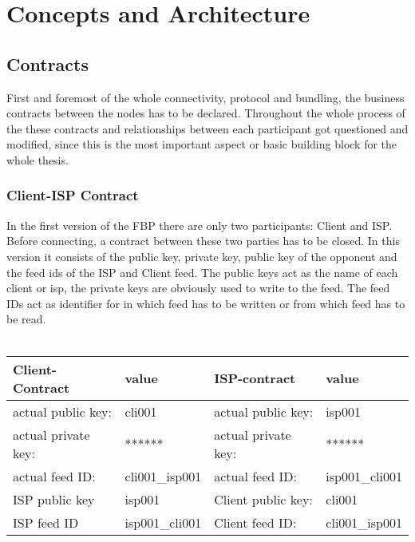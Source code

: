 \chapter{Concepts and Architecture}



\section{Contracts}
First and foremost of the whole connectivity, protocol and bundling, the business contracts between the nodes has to be declared. Throughout the whole process of the these contracts and relationships between each participant got questioned and modified, since this is the most important aspect or basic building block for the whole thesis. 

\subsection{Client-ISP Contract}
In the first version of the FBP there are only two participants: Client and ISP. Before connecting, a contract between these two parties has to be closed. In this version it consists of the public key, private key, public key of the opponent and the feed ids of the ISP and Client feed. The public keys act as the name of each client or isp, the private keys are obviously used to write to the feed. The feed IDs act as identifier for in which feed has to be written or from which feed has to be read. \\\\
\begin{tabular}{llll} \toprule
    Client-Contract&value&ISP-contract&value\\ \midrule
    actual public key:& cli001 &  actual public key: &isp001  \\ 
    actual private key:& ****** & actual private key:& ****** \\
    actual feed ID:& cli001\_isp001 &actual feed ID:&isp001\_cli001 \\ 
    ISP public key&isp001&Client public key:&cli001\\
    ISP feed ID&isp001\_cli001&Client feed ID:&cli001\_isp001\\\bottomrule
\end{tabular}
